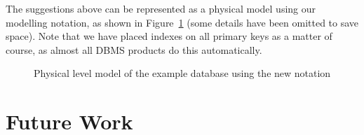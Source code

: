\documentclass{CRPITStyle}
\begin{document}
The suggestions above can be represented as a physical model using our
modelling notation, as shown in Figure~\ref{fig-physical-model} (some
details have been omitted to save space). Note that we have placed
indexes on all primary keys as a matter of course, as almost all DBMS
products do this automatically.


\begin{figure}[htb]
	\caption{Physical level model of the example database using the new notation}
	\label{fig-physical-model}
\end{figure}


\section{Future Work}
\label{sec-future}
\end{document}
